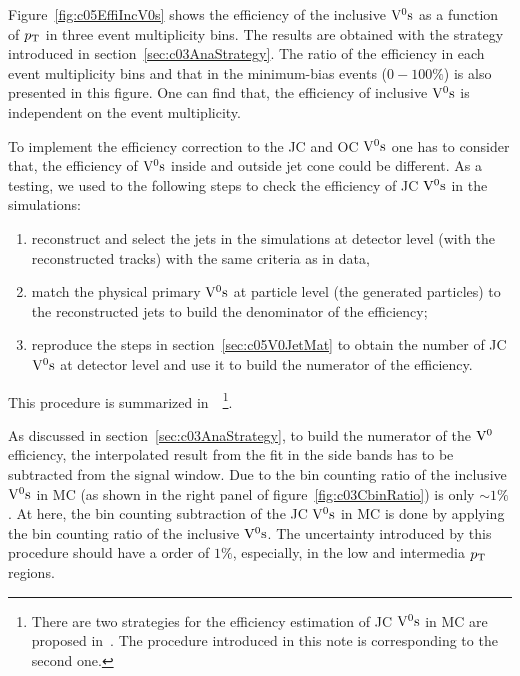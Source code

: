 Figure~\ref{fig:c05EffiIncV0s} shows the efficiency of the inclusive ${\rm V}^{0}{\rm s}$
as a function of $p_{\rm T}$ in three event multiplicity bins.
The results are obtained with the strategy introduced
in section~\ref{sec:c03AnaStrategy}.
The ratio of the efficiency in each event multiplicity bins and that in the
minimum-bias events ($0-100\%$) is also presented in this figure.
One can find that, the efficiency of inclusive ${\rm V}^{0}{\rm s}$ is independent on
the event multiplicity.

To implement the efficiency correction to the JC and OC ${\rm V}^{0}{\rm s}$ one has to
consider that,
the efficiency of ${\rm V}^{0}{\rm s}$ inside and outside jet cone could be different.
As a testing, we used to the following steps to check the efficiency of
JC ${\rm V}^{0}{\rm s}$
in the simulations:
\begin{enumerate}
\item reconstruct and select the jets in the simulations at
      detector level (with the reconstructed tracks) with the same criteria
      as in data,
\item match the physical primary ${\rm V}^{0}{\rm s}$ at particle level (the generated
      particles) to the reconstructed jets to build the denominator of
      the efficiency;
\item reproduce the steps in section~\ref{sec:c05V0JetMat} to obtain the
      number of JC ${\rm V}^{0}{\rm s}$ at detector level and use it to build the
      numerator of the efficiency.
\end{enumerate}
This procedure is summarized
in~\cite{Zimmermann:AliPWGJE20140401}~\footnote{There are two strategies for
the efficiency estimation of JC ${\rm V}^{0}{\rm s}$  in MC are proposed
in~\cite{Zimmermann:AliPWGJE20140401}.
The procedure introduced in this note is corresponding to the second one.}.

As discussed in section~\ref{sec:c03AnaStrategy},
to build the numerator of the ${\rm V}^{0}$ efficiency,
the interpolated result from the fit in the side bands has to be subtracted
from the signal window.
Due to the bin counting ratio of the inclusive ${\rm V}^{0}{\rm s}$ in MC (as shown in
the right panel of figure~\ref{fig:c03CbinRatio}) is only $\sim 1\%$.
At here, the bin counting subtraction of the JC ${\rm V}^{0}{\rm s}$ in MC is done
by applying the bin counting ratio of the inclusive ${\rm V}^{0}{\rm s}$.
The uncertainty introduced by this procedure should have a order of $1\%$,
especially, in the low and intermedia $p_{\rm T}$ regions.

